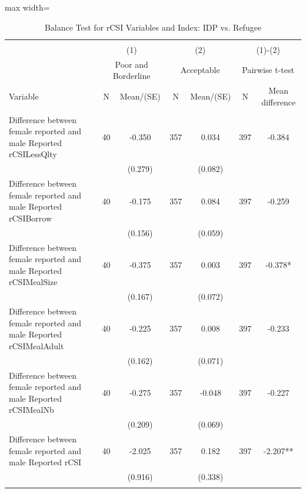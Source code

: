 \documentclass{article}
\begin{document}
\begin{table}[!htbp]
\centering
\caption{Balance Test for rCSI Variables and Index: IDP vs. Refugee}
\begin{adjustbox}{max width=\textwidth}
\begin{tabular}{@{\extracolsep{5pt}}lcccccc}
\\[-1.8ex]\hline \hline \\[-1.8ex]
 & \multicolumn{2}{c}{(1)}  & \multicolumn{2}{c}{(2)}  & \multicolumn{2}{c}{(1)-(2)} \\
 & \multicolumn{2}{c}{Poor and Borderline}  & \multicolumn{2}{c}{Acceptable}  & \multicolumn{2}{c}{Pairwise t-test}  \\
Variable & N & Mean/(SE) & N & Mean/(SE) & N & Mean difference \\ \hline \\[-1.8ex] 
Difference between female reported and male Reported rCSILessQlty   & 40    & -0.350    & 357    & 0.034    & 397    & -0.384   \\
 &   & (0.279)  &   & (0.082)  &   &  \\ [1ex]
Difference between female reported and male Reported rCSIBorrow   & 40    & -0.175    & 357    & 0.084    & 397    & -0.259   \\
 &   & (0.156)  &   & (0.059)  &   &  \\ [1ex]
Difference between female reported and male Reported rCSIMealSize   & 40    & -0.375    & 357    & 0.003    & 397    & -0.378*   \\
 &   & (0.167)  &   & (0.072)  &   &  \\ [1ex]
Difference between female reported and male Reported rCSIMealAdult   & 40    & -0.225    & 357    & 0.008    & 397    & -0.233   \\
 &   & (0.162)  &   & (0.071)  &   &  \\ [1ex]
Difference between female reported and male Reported rCSIMealNb   & 40    & -0.275    & 357    & -0.048    & 397    & -0.227   \\
 &   & (0.209)  &   & (0.069)  &   &  \\ [1ex]
Difference between female reported and male Reported rCSI   & 40    & -2.025    & 357    & 0.182    & 397    & -2.207**   \\
 &   & (0.916)  &   & (0.338)  &   &  \\ [1ex]
\hline \hline \\[-1.8ex]

\end{tabular}
\end{adjustbox}
\end{table}
\end{document}
